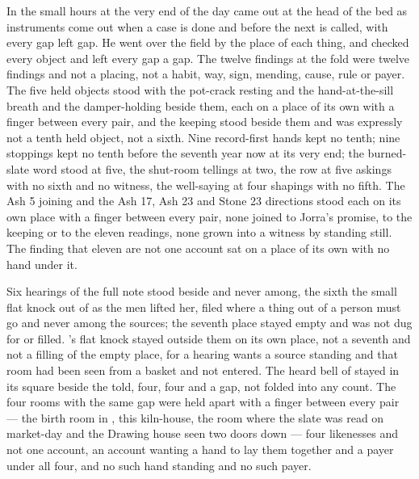 \scenebreak

In the small hours at the very end of the day  came out at the head of the bed as instruments come out when a case is done and before the next is called, with every gap left gap. He went over the field by the place of each thing, and checked every object and left every gap a gap. The twelve findings at the fold were twelve findings and not a placing, not a habit, way, sign, mending, cause, rule or payer. The five held objects stood with the pot-crack resting and the hand-at-the-sill breath and the damper-holding beside them, each on a place of its own with a finger between every pair, and the keeping stood beside them and was expressly not a tenth held object, not a sixth. Nine record-first hands kept no tenth; nine stoppings kept no tenth before the seventh year now at its very end; the burned-slate word stood at five, the shut-room tellings at two, the row at five askings with no sixth and no witness, the well-saying at four shapings with no fifth. The Ash 5 joining and the Ash 17, Ash 23 and Stone 23 directions stood each on its own place with a finger between every pair, none joined to Jorra's promise, to the keeping or to the eleven readings, none grown into a witness by standing still. The finding that eleven are not one account sat on a place of its own with no hand under it.

Six hearings of the full note stood beside and never among, the sixth the small flat knock out of  as the men lifted her, filed where a thing out of a person must go and never among the sources; the seventh place stayed empty and was not dug for or filled. 's flat knock stayed outside them on its own place, not a seventh and not a filling of the empty place, for a hearing wants a source standing and that room had been seen from a basket and not entered. The heard bell of  stayed in its square beside the told, four, four and a gap, not folded into any count. The four rooms with the same gap were held apart with a finger between every pair --- the birth room in , this kiln-house, the room where the slate was read on market-day and the Drawing house seen two doors down --- four likenesses and not one account, an account wanting a hand to lay them together and a payer under all four, and no such hand standing and no such payer.

